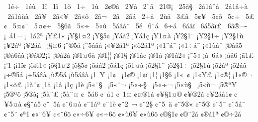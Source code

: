 {^^a01^^e9^^f7
^^a01^^e9^^f9
^^a01^^ee
^^a01^^ef
^^a01^^f5
^^a01^^f7
^^a01^^f9
^^a02^^a2^^ae^^e2
^^a02^^a5^^e0
^^a02^^a8^^e5
^^a02^^ad1^^ae^^a1
^^a02^^ad5^^e3^^a7
^^a02^^e11^^e2^^a8^^e0
^^a02^^e11^^e2^^f7^^e0
^^a02^^e11^^e2^^f9^^e0
^^a02^^e3^^a5
^^a02^^e3^^ab^^a5
^^a02^^e3^^ab^^f5
^^a02^^e3^^ac
^^a02^^e3^^ad
^^a02^^e3^^e1
^^a02^^f7^^e5
^^a02^^f9^^e5
^^a03^^a3^^e3
^^a05^^a2^^a5
^^a05^^a2^^f5
^^a05^^a2^^f7
^^a05^^a3^^a2
^^a05^^a4^^a2^^a8
^^a05^^a4^^a2^^f7
^^a05^^a76^^e3
^^a05^^ab^^f7
^^a05^^ab^^f9
^^a05^^e1^^e2^^e0^^a8
^^a05^^e9
^^a06^^ad^^a8^^ad^^e1
^^a06^^ad^^f7^^ad^^e1
^^a06^^e1^^e2^^ef^^ad
^^a06^^e15^^e2^^ef^^a3
^^a06^^e2^^ae^^ac^^ad
^^a1^^a0^^e11^^ac
^^a1^^a01^^e12^^aa
^^a1^^a5^^a31^^ab
^^a1^^a5^^a71^^a42
^^a1^^a5^^a75^^a2
^^a1^^a5^^e1^^e12
^^a1^^a5^^e11^^e7
^^a1^^a51^^a4^^e0
^^a1^^a52^^a71^^a8
^^a1^^a52^^a71^^f7
^^a1^^a52^^a71^^f9
^^a1^^a52^^e1^^aa
^^a1^^a52^^e1^^e2^^a0
^^a1^^a7^^a46
^^a1^^a8^^ae5^^e1
^^a1^^a85^^e1^^e2^^e0
^^a1^^ab^^a52^^e11^^aa
^^a1^^ab^^f52^^e11^^aa
^^a1^^ab1^^a8^^e1^^af
^^a1^^ab1^^f7^^e1^^af
^^a1^^ab1^^f9^^e1^^af
^^a1^^ae^^e0^^e25
^^a1^^ae^^e06^^e2^^e0
^^a1^^ae^^e1^^ae2^^a11
^^a1^^ae^^e12^^e1
^^a1^^ae1^^a46^^e0
^^a1^^ae1^^a6^^a6
^^a1^^ae1^^a7
^^a1^^ae1^^e0^^a2
^^a1^^ae1^^e1
^^a1^^ae1^^e22^^ab
^^a1^^af5^^ab
^^a1^^e0^^a06^^e1^^ab
^^a1^^e1^^e26
^^a1^^e31^^a3
^^a1'1
^^a1^^ec1^^ef^^a2
^^a1^^f5^^a31^^ab
^^a1^^f5^^a71^^a42
^^a1^^f5^^a75^^a2
^^a1^^f5^^e1^^e12
^^a1^^f5^^e11^^e7
^^a1^^f51^^a4^^e0
^^a1^^f52^^a71^^a8
^^a1^^f52^^a71^^f7
^^a1^^f52^^a71^^f9
^^a1^^f52^^e1^^aa
^^a1^^f52^^e1^^e2^^a0
^^a1^^f7^^ae5^^e1
^^a1^^f75^^e1^^e2^^e0
^^a1^^f9^^ae5^^e1
^^a1^^f95^^e1^^e2^^e0
^^a11^^a0^^a5
^^a11^^a2^^a0
^^a11^^a2^^ae
^^a11^^a2^^ef
^^a11^^a6
^^a11^^a76
^^a11^^ab^^a0^^a2
^^a11^^ab^^a5^^a3
^^a11^^ab^^ae^^a6
^^a11^^ab^^ae^^ac
^^a11^^ab^^f5^^a3
^^a11^^e0^^a8^^a2
^^a11^^e4
^^a11^^e5
^^a11^^e7
^^a11^^e8
^^a15^^ab^^a8^^a7^^a0
^^a15^^ab^^a8^^ac
^^a15^^ab^^f7^^a7^^a0
^^a15^^ab^^f7^^ac
^^a15^^ab^^f9^^a7^^a0
^^a15^^ab^^f9^^ac
^^a15^^ae^^aa^^a5
^^a15^^ae^^aa^^f5
^^a15^^ae^^e0^^a1
^^a15^^e0^^a8^^a3
^^a15^^e0^^a8^^a4
^^a2^^a0^^ad5^^e16
^^a2^^a0^^e51
^^a2^^a01^^a4
^^a2^^a4^^ae1^^e1
^^a2^^a5^^a71^^a4^^ae
^^a2^^a5^^ae2^^e1
^^a2^^a52^^e1^^e21^^a2
^^a2^^a55^^a4^^e0
^^a2^^a7^^a8^^e15
^^a2^^a8^^a05^^e1
^^a2^^a8^^ad6^^a4^^e0
^^a2^^a81^^e1^^aa
^^a2^^a81^^e8
^^a2^^a82^^a0^^ac
^^a2^^a82^^a7^^ad
^^a2^^a85^^a0^^e4
^^a2^^a85^^ae^^ab
^^a2^^a85^^ae^^ad
^^a2^^a85^^af
^^a2^^a85^^e1^^af
^^a2^^a85^^ad^^a8
^^a2^^aa1^^ad
^^a2^^ab^^a86^^a5
^^a2^^ab^^a86^^f5
^^a2^^ab^^f76^^a5
^^a2^^ab^^f76^^f5
^^a2^^ab^^f96^^a5
^^a2^^ab^^f96^^f5
^^a2^^ae^^a71^^a2
^^a2^^ae^^a82^^e1
^^a2^^ae^^e11^^aa
^^a2^^ae^^f72^^e1
}
